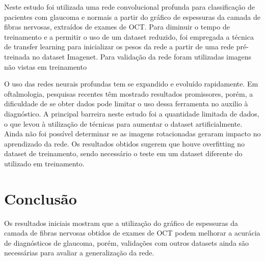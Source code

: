 \documentclass[conference]{IEEEtran}
\begin{document}

Neste estudo foi utilizada uma rede convolucional profunda para classificação de pacientes com glaucoma e normais a partir do gráfico de espessuras da camada de fibras nervosas, extraídos de exames de OCT. Para diminuir o tempo de treinamento e a permitir o uso de um dataset reduzido, foi empregada a técnica de transfer learning para inicializar os pesos da rede a partir de uma rede pré-treinada no dataset Imagenet. Para validação da rede foram utilizadas imagens não vistas em treinamento

O uso das redes neurais profundas tem se expandido e evoluído rapidamente. Em oftalmologia, pesquisas recentes têm mostrado resultados promissores, porém, a dificuldade de se obter dados pode limitar o uso dessa ferramenta no auxilio à diagnóstico. A principal barreira neste estudo foi a quantidade limitada de dados, o que levou à utilização de técnicas para aumentar o dataset artificialmente. Ainda não foi possível determinar se as imagens rotacionadas geraram impacto no aprendizado da rede. Os resultados obtidos sugerem que houve overfitting no dataset de treinamento, sendo necessário o teste em um dataset diferente do utilizado em treinamento.%


\section{Conclusão}

Os resultados iniciais mostram que a utilização do gráfico de espessuras da camada de fibras nervosas obtidos de exames de OCT podem melhorar a acurácia de diagnósticos de glaucoma, porém, validações com outros datasets ainda são necessárias para avaliar a generalização da rede. %




\end{document}
